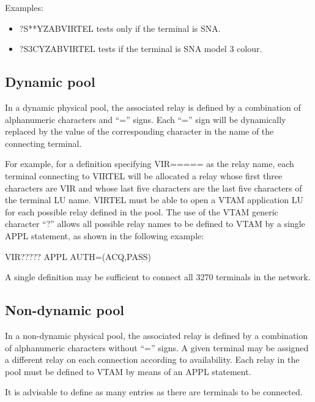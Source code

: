 \documentclass[letterpaper,10pt,english]{sphinxmanual}
\begin{document}
Examples:
\begin{itemize}
\item {} 
?S**YZABVIRTEL tests only if the terminal is SNA.

\item {} 
?S3CYZABVIRTEL tests if the terminal is SNA model 3 colour.

\end{itemize}


\subsection{Dynamic pool}
\label{\detokenize{connectivity_guide:dynamic-pool}}
In a dynamic physical pool, the associated relay is defined by a combination of alphanumeric characters and “=” signs. Each “=” sign will be dynamically replaced by the value of the corresponding character in the name of the connecting
terminal.

For example, for a definition specifying VIR===== as the relay name, each terminal connecting to VIRTEL will be allocated a relay whose first three characters are VIR and whose last five characters are the last five characters of the terminal LU name. VIRTEL must be able to open a VTAM application LU for each possible relay defined in the pool. The use of the VTAM generic character “?” allows all possible relay names to be defined to VTAM by a single APPL statement, as shown in the following example:

\begin{sphinxVerbatim}[commandchars=\\\{\}]
VIR????? APPL AUTH=(ACQ,PASS)
\end{sphinxVerbatim}

A single definition may be sufficient to connect all 3270 terminals in the network.


\subsection{Non-dynamic pool}
\label{\detokenize{connectivity_guide:non-dynamic-pool}}
In a non-dynamic physical pool, the associated relay is defined by a combination of alphanumeric characters without “=” signs. A given terminal may be assigned a different relay on each connection according to availability. Each relay in the pool must be defined to VTAM by means of an APPL statement.

It is advisable to define as many entries as there are terminals to be connected.
\end{document}
